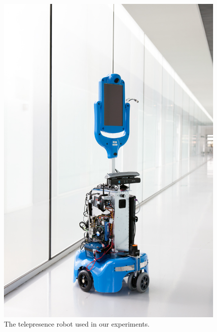 \documentclass[a4paper,11pt]{report}
\begin{document}
  	\begin{figure}[tbh]
	\centering
	\captionsetup[subfigure]{justification=centering}
	\hspace{-1cm}
    \includegraphics[scale=0.13]{figures/robot.jpg}

    \caption{The telepresence robot used in our experiments.}
    \vspace{-2mm}
  \label{fig:robot}
  \end{figure}
\end{document}
